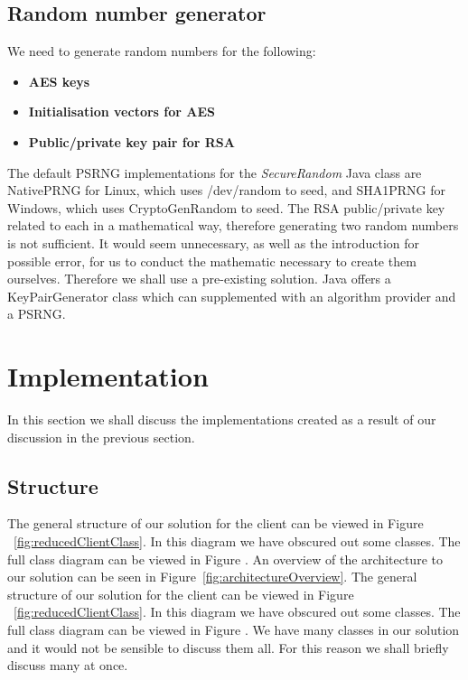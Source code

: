 \documentclass[12pt, titlepage]{article}
\begin{document}
\subsection{Random number generator}
We need to generate random numbers for the following:
\begin{itemize}
	\item \textbf{AES keys}
	\item \textbf{Initialisation vectors for AES}
	\item \textbf{Public/private key pair for RSA}
\end{itemize}
The default PSRNG implementations for the \textit{SecureRandom} Java class are NativePRNG for Linux, which uses /dev/random to seed, and SHA1PRNG for Windows, which uses CryptoGenRandom to seed.
\newline \indent The RSA public/private key related to each in a mathematical way, therefore generating two random numbers is not sufficient. It would seem unnecessary, as well as the introduction for possible error, for us to conduct the mathematic necessary to create them ourselves. Therefore we shall use a pre-existing solution. Java offers a KeyPairGenerator class which can supplemented with an algorithm provider and a PSRNG.

\section{Implementation}
In this section we shall discuss the implementations created as a result of our discussion in the previous section.
\subsection{Structure}
The general structure of our solution for the client can be viewed in Figure ~\ref{fig:reducedClientClass}. In this diagram we have obscured out some classes. The full class diagram can be viewed in Figure .
An overview of the architecture to our solution can be seen in Figure~\ref{fig:architectureOverview}.
\newline \indent The general structure of our solution for the client can be viewed in Figure ~\ref{fig:reducedClientClass}. In this diagram we have obscured out some classes. The full class diagram can be viewed in Figure .
 \newline \indent We have many classes in our solution and it would not be sensible to discuss them all. For this reason we shall briefly discuss many at once.
 
\end{document}
